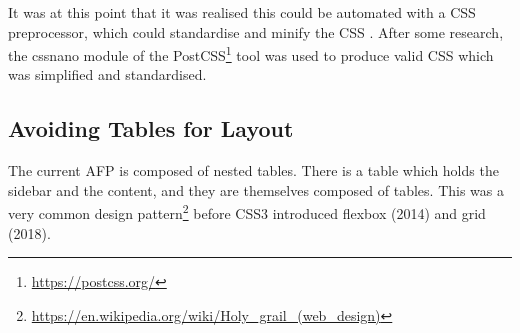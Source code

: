 \documentclass[bsc,frontabs,oneside,singlespacing,parskip,deptreport,logo]{infthesis}
\begin{document}
It was at this point that it was realised this could be automated with a CSS preprocessor, which could standardise and minify the CSS \cite{DBLP:conf/slate/Queiros17}. After some research, the cssnano module of the PostCSS\footnote{\url{https://postcss.org/}} tool was used to produce valid CSS which was simplified and standardised.

\subsection{Avoiding Tables for Layout} \label{sec:table-layout}

The current AFP is composed of nested tables. There is a table which holds the sidebar and the content, and they are themselves composed of tables. This was a very common design pattern\footnote{\url{https://en.wikipedia.org/wiki/Holy\_grail\_(web\_design)}} before CSS3 introduced flexbox (2014) and grid (2018).








\end{document}

